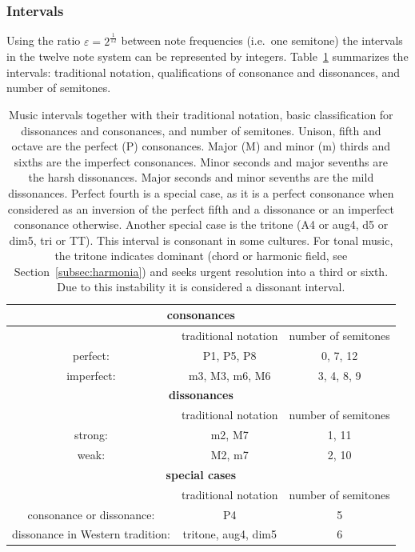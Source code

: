 \subsubsection{Intervals}\label{subsec:intervalos}
Using the ratio $\varepsilon=2^{\frac{1}{12}}$ between note frequencies (i.e.\ one semitone) the intervals in the twelve note system can be represented by integers. Table~\ref{eq:intervalos} summarizes the intervals: traditional notation, qualifications of consonance and
dissonances, and number of semitones.

\begin{table}[htp!]
\centering
\caption{Music intervals together with their traditional notation, basic classification for dissonances and consonances, and number of semitones. Unison, fifth and octave are the perfect (P) consonances. Major (M) and minor (m) thirds and sixths are the imperfect consonances. Minor seconds and major sevenths are the harsh dissonances. Major seconds and minor sevenths are the mild dissonances. Perfect fourth is a special case, as it is a perfect consonance when considered as an inversion of the perfect fifth and a dissonance or an imperfect consonance otherwise. Another special case is the tritone (A4 or aug4, d5 or dim5, tri or TT). This interval is consonant in some cultures.
	For tonal music, the tritone indicates dominant (chord or harmonic field, see Section~\ref{subsec:harmonia}) and seeks urgent resolution into a third or sixth. Due to this instability it is considered a dissonant interval.}
\begin{tabular}{ c | c | c }\hline
    \multicolumn{3}{c}{\bf consonances}  \\\hline
   & traditional notation & number of semitones \\
   perfect: & P1, P5, P8 & 0, 7, 12 \\
 imperfect: & m3, M3, m6, M6 & 3, 4, 8, 9 \\\hline\hline
    \multicolumn{3}{c}{\bf dissonances} \\\hline
 & traditional notation & number of semitones \\
 strong: & m2, M7 & 1, 11 \\
 weak: & M2, m7 & 2, 10 \\\hline\hline
    \multicolumn{3}{c}{\bf special cases} \\\hline
 & traditional notation & number of semitones \\
 consonance or dissonance: & P4 & 5 \\
 dissonance in Western tradition: & tritone, aug4, dim5 & 6 \\\hline
\end{tabular}\label{eq:intervalos}
\end{table}


